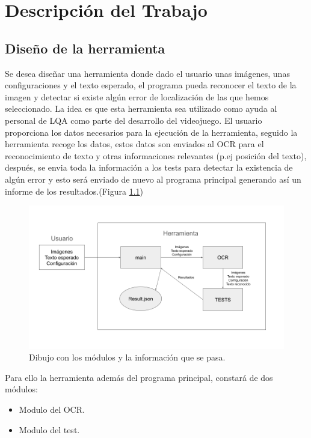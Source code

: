 \chapter{Descripción del Trabajo}
\label{cap:descripcionTrabajo}
\section{Diseño de la herramienta}
\label{sec:Descripción de la herramienta}
Se desea diseñar una herramienta donde dado el usuario unas imágenes, unas configuraciones y el texto esperado, el programa pueda reconocer el texto de la imagen y detectar si existe algún error de localización de las que hemos seleccionado.
La idea es que esta herramienta sea utilizado como ayuda al personal de LQA como parte del desarrollo del videojuego.
El usuario proporciona los datos necesarios para la ejecución de la herramienta, seguido la herramienta recoge los datos, estos datos son enviados al OCR para el reconocimiento de texto y otras informaciones relevantes (p.ej posición del texto), después, se envia toda la información a los tests para detectar la existencia de algún error y esto será enviado de nuevo al programa principal generando así un informe de los resultados.(Figura \ref{fig:Descripcion_Herramienta})
\begin{figure}[H]
	\centering
	\includegraphics[width = 1\textwidth]{Imagenes/Descripcion_Herramienta.png}
	\caption{Dibujo con los módulos y la información que se pasa.}
	\label{fig:Descripcion_Herramienta}
\end{figure}

Para ello la herramienta además del programa principal, constará de dos módulos:
\begin{itemize}
	\item Modulo del OCR.
	\item Modulo del test.
\end{itemize}
